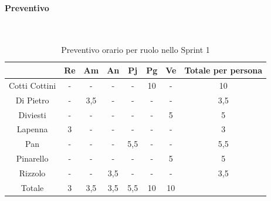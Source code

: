 \documentclass{article}
\begin{document}
                \paragraph{Preventivo}\mbox{}\\
                \begin{table}[H]
                    \centering
                    \begin{tabular}{|c|c|c|c|c|c|c|c|}
                    \hline
                                  & Re  & Am  & An  & Pj  & Pg  & Ve  & Totale per persona \\ \hline
                    Cotti Cottini & -   & -   & -   & -   & 10  & -   & 10                 \\ \hline
                    Di Pietro     & -   & 3,5 & -   & -   & -   & -   & 3,5                \\ \hline
                    Diviesti      & -   & -   & -   & -   & -   & 5   & 5                  \\ \hline
                    Lapenna       & 3   & -   & -   & -   & -   & -   & 3                  \\ \hline
                    Pan           & -   & -   & -   & 5,5 & -   & -   & 5,5                \\ \hline
                    Pinarello     & -   & -   & -   & -   & -   & 5   & 5                  \\ \hline
                    Rizzolo       & -   & -   & 3,5 & -   & -   & -   & 3,5                \\ \hline
                    Totale        & 3   & 3,5 & 3,5 & 5,5 & 10  & 10  &                    \\ \hline
                    \end{tabular}
                    \caption{Preventivo orario per ruolo nello Sprint 1}
                \end{table}

\end{document}
